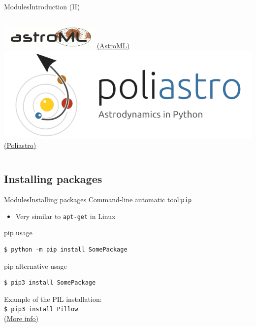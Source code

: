 \documentclass[10pt,compress]{beamer} %
\begin{document}
{\begin{frame}{Modules}{Introduction (II)}
    \begin{columns}
            \centering \includegraphics[width=\linewidth]{figs/astroml.png}
            \href{https://www.astroml.org/}{(AstroML)}
            \centering \includegraphics[width=\linewidth]{figs/poliastro.png}
            \href{https://docs.poliastro.space/en/stable/index.html}{(Poliastro)}
    \end{columns}
\end{frame}

}{}

\subsection{Installing packages}
\begin{frame}[fragile]{Modules}{Installing packages}
	Command-line automatic tool:\texttt{pip} 
		\begin{itemize}
			\item Very similar to \texttt{apt-get} in Linux
		\end{itemize}

	\begin{block}{pip usage}
	\begin{verbatim}
$ python -m pip install SomePackage
\end{verbatim}
	\end{block}

	\begin{block}{pip alternative usage}
	\begin{verbatim}
$ pip3 install SomePackage
\end{verbatim}
	\end{block}
	Example of the PIL  installation:\\
	\texttt{\$ pip3 install Pillow}\\
    \href{http://recursospython.com/guias-y-manuales/instalacion-y-utilizacion-de-pip-en-windows-linux-y-os-x/}{(More info)}
\end{frame}
\end{document}
